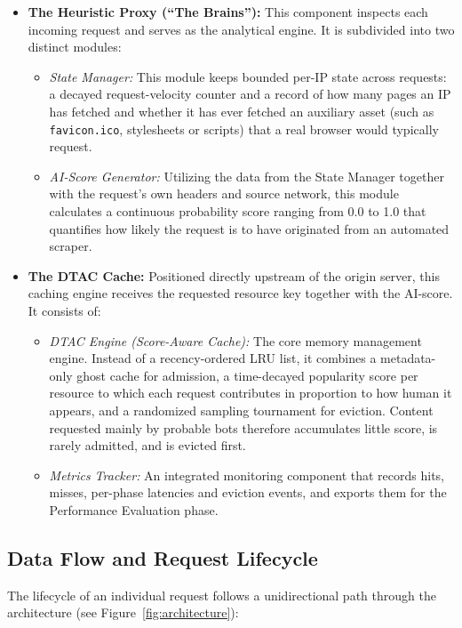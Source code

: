 \begin{itemize}
    \item \textbf{The Heuristic Proxy (``The Brains''):} This component inspects each incoming request and serves as the analytical engine. It is subdivided into two distinct modules:
    \begin{itemize}
        \item \textit{State Manager:} This module keeps bounded per-IP state across requests: a decayed request-velocity counter and a record of how many pages an IP has fetched and whether it has ever fetched an auxiliary asset (such as \texttt{favicon.ico}, stylesheets or scripts) that a real browser would typically request.
        \item \textit{AI-Score Generator:} Utilizing the data from the State Manager together with the request's own headers and source network, this module calculates a continuous probability score ranging from 0.0 to 1.0 that quantifies how likely the request is to have originated from an automated scraper.
    \end{itemize}
    \item \textbf{The DTAC Cache:} Positioned directly upstream of the origin server, this caching engine receives the requested resource key together with the AI-score. It consists of:
    \begin{itemize}
        \item \textit{DTAC Engine (Score-Aware Cache):} The core memory management engine. Instead of a recency-ordered LRU list, it combines a metadata-only ghost cache for admission, a time-decayed popularity score per resource to which each request contributes in proportion to how human it appears, and a randomized sampling tournament for eviction. Content requested mainly by probable bots therefore accumulates little score, is rarely admitted, and is evicted first.
        \item \textit{Metrics Tracker:} An integrated monitoring component that records hits, misses, per-phase latencies and eviction events, and exports them for the Performance Evaluation phase.
    \end{itemize}
\end{itemize}

\subsection{Data Flow and Request Lifecycle}
The lifecycle of an individual request follows a unidirectional path through the architecture (see Figure~\ref{fig:architecture}):

